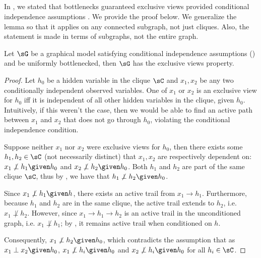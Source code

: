 \subsection{}
\label{app:exclusive-views}

In , we stated that bottlenecks guaranteed
exclusive views provided conditional independence assumptions . 
We provide the proof below.
  We generalize the lemma so that it applies
  on any connected subgraph, not just cliques.
  Also, the statement is made in terms of subgraphs,
  not the entire graph.

\begin{lemma*}
  Let $\sG$ be a graphical model satisfying conditional independence
  assumptions () and be uniformly bottlenecked, then
  $\sG$ has the exclusive views property.
\end{lemma*}

\begin{proof}
Let $h_0$ be a hidden variable in the clique $\sC$ and $x_1, x_2$ be any
  two conditionally independent observed variables. 
One of $x_1$ or $x_2$ is an exclusive view for $h_0$ iff it is
  independent of all other hidden variables in the clique, given $h_0$.
Intuitively, if this weren't the case, then we would be able to find
  an active path between $x_1$ and $x_2$ that does not go through $h_0$,
  violating the conditional independence condition.


Suppose neither $x_1$ nor $x_2$ were exclusive views for $h_0$, 
  then there exists some $h_1, h_2 \in \sC$ (not necessarily distinct)  that $x_1, x_2$ are
  respectively dependent on:
  $x_1 \not\perp h_1 \given h_0$ and $x_2 \not\perp h_2 \given h_0$. 
Both $h_1$ and $h_2$ are part of the same clique $\sC$, thus by
  , we have that $h_1 \not\perp h_2 \given h_0$. 

Since $x_1 \not\perp h_1 \given h$, there exists an active trail from
$x_1 \to h_1$. Furthermore, because $h_1$ and $h_2$ are in the same
clique, the active trail extends to $h_2$, i.e. $x_1 \not\perp h_2$.
However, since $x_1 \to h_1 \to h_2$ is an active trail in the unconditioned graph, i.e. $x_1 \not\perp h_1$; by , it remains active trail when conditioned on $h$.

Consequently, $x_1 \not\perp h_2 \given h_0$, which
contradicts the assumption that as $x_1 \perp x_2 \given h_0$,
$x_1 \not\perp h_i \given h_0$ and $x_2 \not\perp h_i \given h_0$ for all $h_i \in \sC$.

\end{proof}

